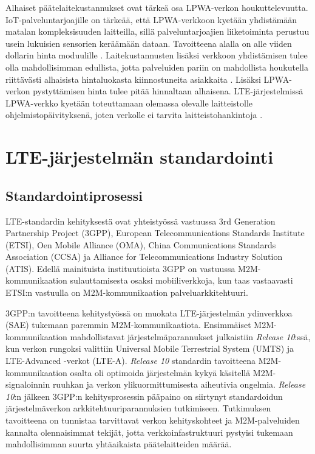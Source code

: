 \documentclass[finnish,12pt,a4paper,pdftex]{article}
\begin{document}
Alhaiset päätelaitekustannukset ovat tärkeä osa LPWA-verkon houkuttelevuutta. IoT-palveluntarjoajille on tärkeää, että LPWA-verkkoon kyetään yhdistämään matalan kompleksisuuden laitteilla, sillä palveluntarjoajien liiketoiminta perustuu usein lukuisien sensorien keräämään dataan. Tavoitteena alalla on alle viiden dollarin hinta moduulille \cite{nokiawhitepaper}. Laitekustannusten lisäksi verkkoon yhdistämisen tulee olla mahdollisimman edullista, jotta palveluiden pariin on mahdollista houkutella riittävästi alhaisista hintaluokasta kiinnostuneita asiakkaita \cite{harmaala}. Lisäksi LPWA-verkon pystyttämisen hinta tulee pitää hinnaltaan alhaisena. LTE-järjestelmissä LPWA-verkko kyetään toteuttamaan olemassa olevalle laitteistolle ohjelmistopäivityksenä, joten verkolle ei tarvita laitteistohankintoja \cite{nokiawhitepaper}.


\clearpage
\section{LTE-järjestelmän standardointi}

\subsection{Standardointiprosessi}

LTE-standardin kehityksestä ovat yhteistyössä vastuussa 3rd Generation Partnership Project (3GPP), European Telecommunications Standards Institute (ETSI), Oen Mobile Alliance (OMA), China Communications Standards Association (CCSA) ja Alliance for Telecommunications Industry Solution (ATIS). Edellä mainituista instituutioista 3GPP on vastuussa M2M-kommunikaation sulauttamisesta osaksi mobiiliverkkoja, kun taas vastaavasti ETSI:n vastuulla on M2M-kommunikaation palveluarkkitehtuuri. \cite{ghavimi2015m2m}

3GPP:n tavoitteena kehitystyössä on muokata LTE-järjestelmän ydinverkkoa (SAE) tukemaan paremmin M2M-kommunikaatiota. Ensimmäiset M2M-kommunikaation mahdollistavat järjestelmäparannukset julkaistiin \textit{Release 10}:ssä, kun verkon rungoksi valittiin Universal Mobile Terrestrial System (UMTS) ja LTE-Advanced -verkot (LTE-A). \textit{Release 10} standardin tavoitteena M2M-kommunikaation osalta oli optimoida järjestelmän kykyä käsitellä M2M-signaloinnin ruuhkan ja verkon ylikuormittumisesta aiheutivia ongelmia. \textit{Release 10}:n jälkeen 3GPP:n kehitysprosessin pääpaino on siirtynyt standardoidun järjestelmäverkon arkkitehtuuriparannuksien tutkimiseen. Tutkimuksen tavoitteena on tunnistaa tarvittavat verkon kehityskohteet ja M2M-palveluiden kannalta olennaisimmat tekijät, jotta verkkoinfastruktuuri pystyisi tukemaan mahdollisimman suurta yhtäaikaista päätelaitteiden määrää. \cite{ghavimi2015m2m}
\end{document}
